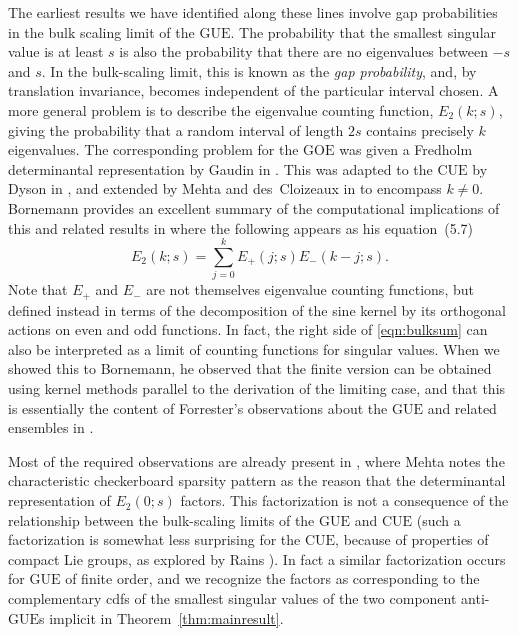 \documentclass[pdftex, oneside, 10pt, letterpaper]{amsart}
\theoremstyle{plain}
\theoremstyle{definition}
\theoremstyle{remark}
\begin{document}
The earliest results we have identified along these lines involve gap
probabilities in the bulk scaling limit of the {\ensuremath{\mathrm{GUE}}}{}.  The
probability that the smallest singular value is at least $s$ is also
the probability that there are no eigenvalues between $-s$ and $s$.
In the bulk-scaling limit, this is known as the \emph{gap
  probability}, and, by translation invariance, becomes independent of
the particular interval chosen.  A more general problem is to describe
the eigenvalue counting function, $E_2(k;s)$, giving the probability
that a random interval of length $2s$ contains precisely $k$
eigenvalues.  The corresponding problem for the {\ensuremath{\mathrm{GOE}}}{} was given a
Fredholm determinantal representation by Gaudin in
\cite{Gaudin1961447}.  This was adapted to the {\ensuremath{\mathrm{CUE}}}{} by Dyson in
\cite{Dyson-STELCSIII}, and extended by Mehta and des~Cloizeaux in
\cite{MehClo} to encompass $k\neq0$.  Bornemann provides an excellent
summary of the computational implications of this and related results
in \cite{Bornemann} where the following appears as his equation~(5.7)
\begin{equation}\label{eqn:bulksum}
  E_2(k;s)=\sum_{j=0}^{k}E_+(j;s)E_-(k-j;s). 
\end{equation}
Note that $E_+$ and $E_-$ are not themselves eigenvalue counting
functions, but defined instead in terms of the decomposition of the
sine kernel by its orthogonal actions on even and odd functions.  In
fact, the right side of \eqref{eqn:bulksum} can also be interpreted as
a limit of counting functions for singular values.  When we showed
this to Bornemann, he observed that the finite version can be obtained
using kernel methods parallel to the derivation of the limiting case,
and that this is essentially the content of Forrester's observations
about the {\ensuremath{\mathrm{GUE}}}{} and related ensembles in \cite{Forrester-Evenness}.

Most of the required observations are already present in
\cite[Ch.~6]{Mehta}, where Mehta notes the characteristic checkerboard
sparsity pattern as the reason that the determinantal representation
of $E_2(0;s)$ factors.  This factorization is not a consequence of the
relationship between the bulk-scaling limits of the {\ensuremath{\mathrm{GUE}}}{} and {\ensuremath{\mathrm{CUE}}}{}
(such a factorization is somewhat less surprising for the {\ensuremath{\mathrm{CUE}}}{},
because of properties of compact Lie groups, as explored by Rains
\cite{Rains-Powers, Rains-power-images}).  In fact a similar
factorization occurs for {\ensuremath{\mathrm{GUE}}}{} of finite order, and we recognize the
factors as corresponding to the complementary cdfs of the smallest
singular values of the two component anti-{\ensuremath{\mathrm{GUE}}}{}s implicit in
Theorem~\ref{thm:mainresult}.
\end{document}
